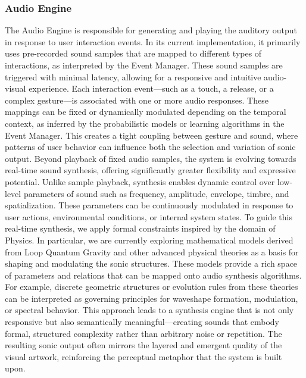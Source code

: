 \documentclass{article}
\begin{document}
\subsubsection{Audio Engine}
The Audio Engine is responsible for generating and playing the auditory output in response to user interaction events. In its current implementation, it primarily uses pre-recorded sound samples that are mapped to different types of interactions, as interpreted by the Event Manager. These sound samples are triggered with minimal latency, allowing for a responsive and intuitive audio-visual experience. \newline 
Each interaction event—such as a touch, a release, or a complex gesture—is associated with one or more audio responses. These mappings can be fixed or dynamically modulated depending on the temporal context, as inferred by the probabilistic models or learning algorithms in the Event Manager. This creates a tight coupling between gesture and sound, where patterns of user behavior can influence both the selection and variation of sonic output. \newline 
Beyond playback of fixed audio samples, the system is evolving towards real-time sound synthesis, offering significantly greater flexibility and expressive potential. Unlike sample playback, synthesis enables dynamic control over low-level parameters of sound such as frequency, amplitude, envelope, timbre, and spatialization. These parameters can be continuously modulated in response to user actions, environmental conditions, or internal system states. \newline 
To guide this real-time synthesis, we apply formal constraints inspired by the domain of Physics. In particular, we are currently exploring mathematical models derived from Loop Quantum Gravity and other advanced physical theories as a basis for shaping and modulating the sonic structures. These models provide a rich space of parameters and relations that can be mapped onto audio synthesis algorithms. For example, discrete geometric structures or evolution rules from these theories can be interpreted as governing principles for waveshape formation, modulation, or spectral behavior. \newline 
This approach leads to a synthesis engine that is not only responsive but also semantically meaningful—creating sounds that embody formal, structured complexity rather than arbitrary noise or repetition. The resulting sonic output often mirrors the layered and emergent quality of the visual artwork, reinforcing the perceptual metaphor that the system is built upon. 
\end{document}
